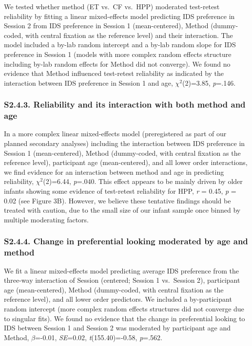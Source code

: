 \documentclass[
  man, donotrepeattitle,floatsintext]{apa6}
\begin{document}
We tested whether method (ET vs.~CF vs.~HPP) moderated test-retest reliability by fitting a linear mixed-effects model predicting IDS preference in Session 2 from IDS preference in Session 1 (mean-centered), Method (dummy-coded, with central fixation as the reference level) and their interaction.
The model included a by-lab random intercept and a by-lab random slope for IDS preference in Session 1 (models with more complex random effects structure including by-lab random effects for Method did not converge).
We found no evidence that Method influenced test-retest reliability as indicated by the interaction between IDS preference in Session 1 and age, \({\chi}^2\)(2)=3.85, \emph{p}=.146.

\hypertarget{s2.4.3.-reliability-and-its-interaction-with-both-method-and-age}{%
\subsubsection{S2.4.3. Reliability and its interaction with both method and age}\label{s2.4.3.-reliability-and-its-interaction-with-both-method-and-age}}

In a more complex linear mixed-effects model (preregistered as part of our planned secondary analyses) including the interaction between IDS preference in Session 1 (mean-centered), Method (dummy-coded, with central fixation as the reference level), participant age (mean-centered), and all lower order interactions, we find evidence for an interaction between method and age in predicting reliability, \({\chi}^2\)(2)=6.44, \emph{p}=.040.
This effect appears to be mainly driven by older infants showing some evidence of test-retest reliability for HPP, \emph{r} = 0.45, \emph{p} = 0.02 (see Figure 3B).
However, we believe these tentative findings should be treated with caution, due to the small size of our infant sample once binned by multiple moderating factors.

\hypertarget{s2.4.4.-change-in-preferential-looking-moderated-by-age-and-method}{%
\subsubsection{S2.4.4. Change in preferential looking moderated by age and method}\label{s2.4.4.-change-in-preferential-looking-moderated-by-age-and-method}}

We fit a linear mixed-effects model predicting average IDS preference from the three-way interaction of Session (centered; Session 1 vs.~Session 2), participant age (mean-centered), Method (dummy-coded, with central fixation as the reference level), and all lower order predictors.
We included a by-participant random intercept (more complex random effects structures did not converge due to singular fits).
We found no evidence that the change in preferential looking to IDS between Session 1 and Session 2 was moderated by participant age and Method, \(\beta\)=-0.01, \emph{SE}=0.02, \emph{t}(155.40)=-0.58, \emph{p}=.562.
\end{document}
